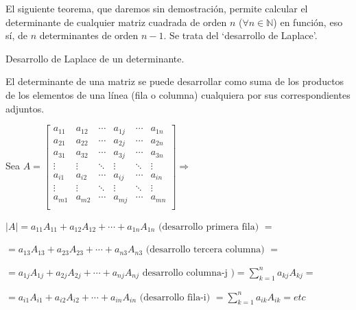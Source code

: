 El siguiente teorema, que daremos sin demostración, permite calcular el determinante de cualquier matriz cuadrada de orden $n$ \textcolor{gris}{($\forall n \in \mathbb N$)} en función, eso sí, de $n$ determinantes de orden $n-1$. Se trata del `desarrollo de Laplace'.

\begin{teor}{Desarrollo de Laplace de un determinante.}
	
	El determinante de una matriz se puede desarrollar como suma de los productos de los elementos de una línea (fila o columna) cualquiera por sus correspondientes adjuntos.
	
	Sea $A=\left[
\begin{matrix}
a_{11} & a_{12} & \cdots & a_{1j} & \cdots & a_{1n} \\
a_{21} & a_{22} & \cdots & a_{2j} & \cdots & a_{2n} \\
a_{31} & a_{32} & \cdots & a_{3j} & \cdots & a_{3n} \\
\vdots & \vdots & \ddots & \vdots & \ddots & \vdots \\
a_{i1} & a_{i2} & \cdots & a_{ij} & \cdots & a_{in} \\
\vdots & \vdots & \ddots & \vdots & \ddots & \vdots \\
a_{m1} & a_{m2} & \cdots & a_{mj} & \cdots & a_{mn} \\
\end{matrix}
\right] \Rightarrow$

\vspace{3mm} $|A|=a_{11}A_{11}+a_{12}A_{12}+\cdots +a_{1n}A_{1n} \text{ (desarrollo primera fila) }= $

$=a_{13}A_{13}+a_{23}A_{23}+\cdots +a_{n3}A_{n3} \text{ (desarrollo tercera columna) } = $

$=a_{1j}A_{1j}+a_{2j}A_{2j}+\cdots +a_{nj}A_{nj} \text{ desarrollo columna-j )}= \displaystyle \sum_{k=1}^n a_{kj}A_{kj} =$

$=a_{i1}A_{i1}+a_{i2}A_{i2}+\cdots +a_{in}A_{in} \text{ (desarrollo fila-i) } = \displaystyle \sum_{k=1}^n a_{ik}A_{ik}=etc$
	
\end{teor}

